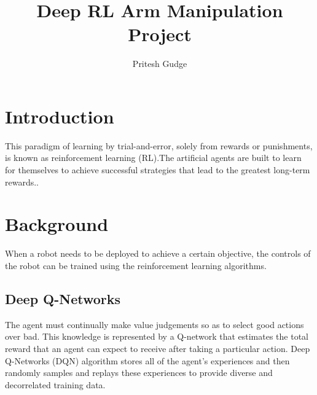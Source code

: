 \documentclass[10pt,journal,compsoc]{IEEEtran}
\begin{document}
\title{Deep RL Arm Manipulation Project}

\author{Pritesh Gudge}

%
{}


\maketitle
\IEEEdisplaynontitleabstractindextext
\IEEEpeerreviewmaketitle
\section{Introduction}
\label{sec:introduction}

 This paradigm of learning by trial-and-error, solely from rewards or punishments, is known as reinforcement learning (RL).The artificial agents are built to learn for themselves to achieve successful strategies that lead to the greatest long-term rewards.\cite{dlintro}.

\section{Background}

When a robot needs to be deployed to achieve a certain objective, the controls of the robot can be trained using the reinforcement learning algorithms. 


\subsection{Deep Q-Networks}
The agent must continually make value judgements so as to select good actions over bad. This knowledge is represented by a Q-network that estimates the total reward that an agent can expect to receive after taking a particular action. Deep Q-Networks (DQN) algorithm stores all of the agent's experiences and then randomly samples and replays these experiences to provide diverse and decorrelated training data\cite{dlintro}.
\end{document}
